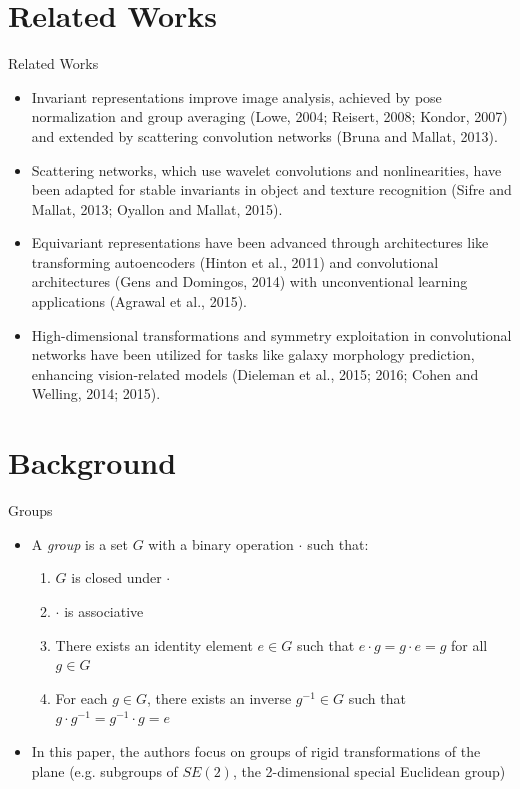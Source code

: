 \documentclass{beamer}
\begin{document}
\section{Related Works}
\begin{frame}{Related Works}
    \begin{itemize}
        \item Invariant representations improve image analysis, achieved by pose normalization and group averaging (Lowe, 2004; Reisert, 2008; Kondor, 2007) and extended by scattering convolution networks (Bruna and Mallat, 2013).
        \item Scattering networks, which use wavelet convolutions and nonlinearities, have been adapted for stable invariants in object and texture recognition (Sifre and Mallat, 2013; Oyallon and Mallat, 2015).
        \item Equivariant representations have been advanced through architectures like transforming autoencoders (Hinton et al., 2011) and convolutional architectures (Gens and Domingos, 2014) with unconventional learning applications (Agrawal et al., 2015).
        \item High-dimensional transformations and symmetry exploitation in convolutional networks have been utilized for tasks like galaxy morphology prediction, enhancing vision-related models (Dieleman et al., 2015; 2016; Cohen and Welling, 2014; 2015).
      \end{itemize}
\end{frame}

\section{Background}
\begin{frame}{Groups}
    \begin{itemize}
        \item A \emph{group} is a set $G$ with a binary operation $\cdot$ such that:
        \begin{enumerate}
            \item $G$ is closed under $\cdot$
            \item $\cdot$ is associative
            \item There exists an identity element $e \in G$ such that $e \cdot g = g \cdot e = g$ for all $g \in G$
            \item For each $g \in G$, there exists an inverse $g^{-1} \in G$ such that $g \cdot g^{-1} = g^{-1} \cdot g = e$
        \end{enumerate}
        \item In this paper, the authors focus on groups of rigid transformations of the plane (e.g. subgroups of $SE(2)$, the 2-dimensional special Euclidean group)
    \end{itemize}
\end{frame}
\end{document}
